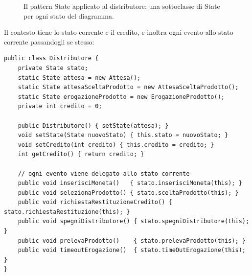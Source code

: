 \begin{figure}[H]
\centering
{}
\caption{Il pattern State applicato al distributore: una sottoclasse di State per ogni stato del diagramma.}
\end{figure}

Il contesto tiene lo stato corrente e il credito, e inoltra ogni evento allo stato corrente passandogli se stesso:

\begin{lstlisting}[style=java]
public class Distributore {
    private State stato;
    static State attesa = new Attesa();
    static State attesaSceltaProdotto = new AttesaSceltaProdotto();
    static State erogazioneProdotto = new ErogazioneProdotto();
    private int credito = 0;

    public Distributore() { setState(attesa); }
    void setState(State nuovoStato) { this.stato = nuovoStato; }
    void setCredito(int credito) { this.credito = credito; }
    int getCredito() { return credito; }

    // ogni evento viene delegato allo stato corrente
    public void inserisciMoneta()   { stato.inserisciMoneta(this); }
    public void selezionaProdotto() { stato.sceltaProdotto(this); }
    public void richiestaRestituzioneCredito() { stato.richiestaRestituzione(this); }
    public void spegniDistributore() { stato.spegniDistributore(this); }
    public void prelevaProdotto()    { stato.prelevaProdotto(this); }
    public void timeoutErogazione()  { stato.timeOutErogazione(this); }
}
\end{lstlisting}

